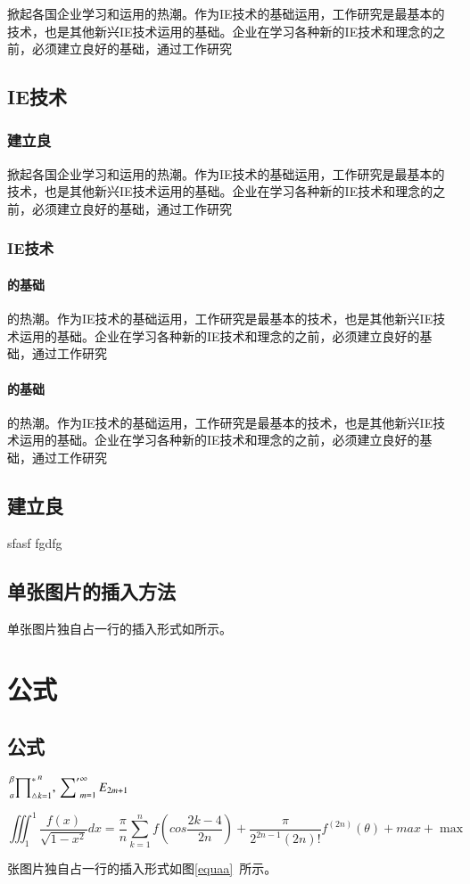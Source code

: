 掀起各国企业学习和运用的热潮。作为IE技术的基础运用，工作研究是最基本的技术，也是其他新兴IE技术运用的基础。企业在学习各种新的IE技术和理念的之前，必须建立良好的基础，通过工作研究\cite{McDonnell1994}
\section{IE技术}
\subsection{建立良}
掀起各国企业学习和运用的热潮。作为IE技术的基础运用，工作研究是最基本的技术，也是其他新兴IE技术运用的基础。企业在学习各种新的IE技术和理念的之前，必须建立良好的基础，通过工作研究
\subsection{IE技术}
\subsubsection{的基础}
的热潮。作为IE技术的基础运用，工作研究是最基本的技术，也是其他新兴IE技术运用的基础。企业在学习各种新的IE技术和理念的之前，必须建立良好的基础，通过工作研究
\subsubsection{的基础}
的热潮。作为IE技术的基础运用，工作研究是最基本的技术，也是其他新兴IE技术运用的基础。企业在学习各种新的IE技术和理念的之前，必须建立良好的基础，通过工作研究
\section{建立良}
sfasf
fgdfg
\section{单张图片的插入方法}
单张图片独自占一行的插入形式如所示。


\chapter{公式}
\section{公式}
$\sideset{^\beta_a}{^\ast_\triangle}
\prod^{n}_{k=1},
\sideset{}{'}\sum_{m=1}^\infty E_{2m+1}$

\begin{equation}
\label{equaa}
\iiint_1^1\frac{f(x)}{\sqrt{1-x^2}}dx = \frac{\pi}{n}\sum_{k=1}^nf(cos\frac{2k-4}{2n})+\frac{\pi}{2^{2n-1}(2n)!}f^{(2n)}(\theta)+max+\max
\end{equation}

张图片独自占一行的插入形式如图\eqref{equaa}~所示。